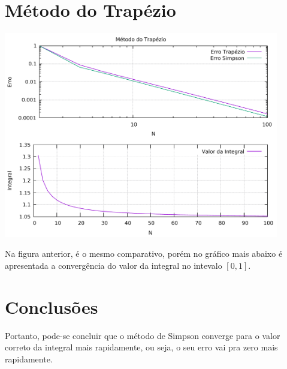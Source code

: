 \section{Método do Trapézio}
\begin{center}
    \includegraphics[width=12cm]{trap.pdf}
\end{center}
Na figura anterior, é o mesmo comparativo, porém no gráfico mais abaixo é apresentada a
convergência do valor da integral no intevalo $[0,1]$.

\section{Conclusões}
Portanto, pode-se concluir que o método de Simpson converge para o valor correto da integral
mais rapidamente, ou seja, o seu erro vai pra zero mais rapidamente.



